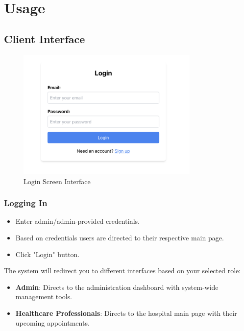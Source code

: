 \documentclass[12pt, titlepage]{article}
\begin{document}
\newpage

\section{Usage}
\subsection{Client Interface}
\begin{figure}[H]
\centering
\includegraphics[width=0.8\textwidth]{login.png}
\caption{Login Screen Interface}
\label{fig:login}
\end{figure}

\subsubsection{Logging In}
\begin{itemize}
\item Enter admin/admin-provided credentials.
\item Based on credentials users are directed to their respective main page.
\item Click "Login" button.
\end{itemize}

The system will redirect you to different interfaces based on your selected role:
\begin{itemize}
\item \textbf{Admin}: Directs to the administration dashboard with system-wide management tools.
\item \textbf{Healthcare Professionals}: Directs to the hospital main page with their upcoming appointments.
\end{itemize}
\end{document}
